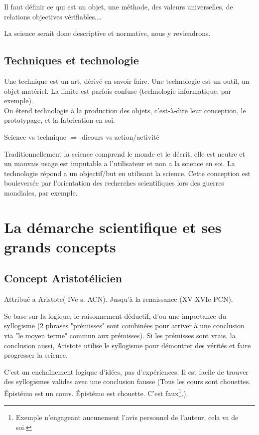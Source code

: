 \documentclass{report}
\begin{document}
	Il faut définir ce qui est un objet, une méthode, des valeurs universelles, de relations objectives vérifiables,\dots
	
	La science serait donc descriptive et normative, nous y reviendrons.
	
	\section{Techniques et technologie}
	
	Une technique est un art, dérivé en savoir faire. Une technologie est un outil, un objet matériel. La limite est parfois confuse (technologie informatique, par exemple).\\
	On étend technologie à la production des objets, c'est-à-dire leur conception, le prototypage, et la fabrication en soi.
	
	Science vs technique $\Rightarrow$ dicours vs action/activité
	
	Traditionnellement la science comprend le monde et le décrit, elle est neutre et un mauvais usage est imputable a l'utilisateur et non a la science en soi. La technologie répond a un objectif/but en utilisant la science. Cette conception est bouleversée par l'orientation des recherches scientifiques lors des guerres mondiales, par exemple.
	
	\chapter{La démarche scientifique et ses grands concepts}
	
	\section{Concept Aristotélicien}
	
	Attribué a Aristote( IVe s. ACN). Jusqu'à la renaissance (XV-XVIe PCN).
	
	Se base sur la logique, le raisonnement déductif, d'ou une importance du syllogisme (2 phrases "prémisses" sont combinées pour arriver à une conclusion via "le moyen terme" commun aux prémisses). Si les prémisses sont vrais, la conclusion aussi, Aristote utilise le syllogisme pour démontrer des vérités et faire progresser la science.
	
	C'est un enchaînement logique d'idées, pas d'expériences. Il est facile de trouver des syllogismes valides avec une conclusion fausse (Tous les cours sont chouettes. \'{E}pistémo est un cours. \'{E}pistémo est chouette. C'est faux\footnote{Exemple n'engageant aucunement l'avis personnel de l'auteur, cela va de soi.}.).
	
\end{document}
